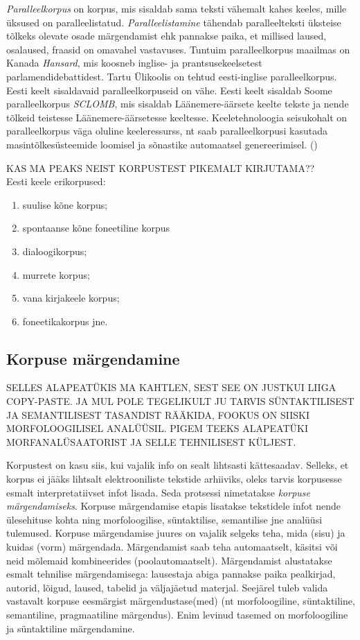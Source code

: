 \documentclass[12pt]{article}
\begin{document}
\emph{Paralleelkorpus} on korpus, mis sisaldab sama teksti vähemalt
kahes keeles, mille üksused on paralleelistatud. \emph{Paralleelistamine} tähendab paralleelteksti üksteise tõlkeks olevate osade märgendamist ehk pannakse paika, et millised laused, osalaused, fraasid on omavahel vastavuses. Tuntuim paralleelkorpus maailmas on Kanada \emph{Hansard}, mis koosneb inglise- ja prantsusekeelsetest parlamendidebattidest. Tartu Ülikoolis on tehtud eesti-inglise paralleelkorpus. Eesti keelt sisaldavaid paralleelkorpuseid on vähe. Eesti keelt sisaldab Soome paralleelkorpus \emph{SCLOMB}, mis sisaldab Läänemere-äärsete keelte tekste ja nende tõlkeid teistesse Läänemere-äärsetesse keeltesse. Keeletehnoloogia seisukohalt on paralleelkorpus väga oluline keeleressurss, nt saab paralleelkorpusi kasutada masintõlkesüsteemide loomisel ja sõnastike automaatsel genereerimisel.
(\citealp[17--18]{KR})


KAS MA PEAKS NEIST KORPUSTEST PIKEMALT KIRJUTAMA??\\
Eesti keele erikorpused:
\begin{enumerate}
    \item suulise kõne korpus;
    \item spontaanse kõne foneetiline korpus
    \item dialoogikorpus;
    \item murrete korpus;
    \item vana kirjakeele korpus;
    \item foneetikakorpus jne.\citep{Keelekogu}
\end{enumerate}


\subsection{Korpuse märgendamine}

SELLES ALAPEATÜKIS MA KAHTLEN, SEST SEE ON JUSTKUI LIIGA COPY-PASTE. JA MUL POLE TEGELIKULT JU TARVIS SÜNTAKTILISEST JA SEMANTILISEST TASANDIST RÄÄKIDA, FOOKUS ON SIISKI MORFOLOOGILISEL ANALÜÜSIL. PIGEM TEEKS ALAPEATÜKI MORFANALÜSAATORIST JA SELLE TEHNILISEST KÜLJEST.

Korpustest on kasu siis, kui vajalik info on sealt lihtsasti kättesaadav. Selleks, et korpus ei jääks lihtsalt elektrooniliste tekstide arhiiviks, oleks tarvis korpusesse esmalt interpretatiivset infot lisada. Seda protsessi nimetatakse \emph{korpuse märgendamiseks}. Korpuse märgendamise etapis lisatakse tekstidele infot nende ülesehituse
kohta ning morfoloogilise, süntaktilise, semantilise jne analüüsi tulemused. Korpuse märgendamise juures on vajalik selgeks teha, mida (sisu) ja kuidas (vorm) märgendada. Märgendamist saab teha automaatselt, käsitsi või neid mõlemaid kombineerides (poolautomaatselt). Märgendamist alustatakse esmalt tehnilise märgendamisega: lausestaja abiga pannakse paika pealkirjad, autorid, lõigud, laused, tabelid ja väljajäetud materjal. Seejärel tuleb valida vastavalt korpuse eesmärgist märgendustase(med) (nt morfoloogiline,
süntaktiline, semantiline, pragmaatiline märgendus). Enim levinud tasemed on morfoloogiline ja süntaktiline märgendamine. \citep[12--13]{KR}
\end{document}
